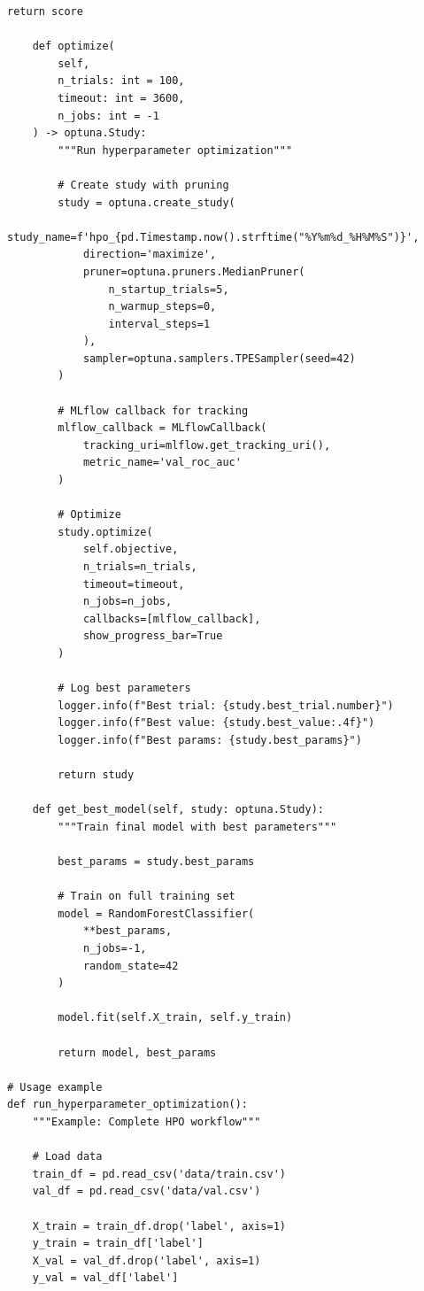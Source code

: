\begin{lstlisting}[style=python, caption=Hyperparameter Optimization with Optuna]
        return score

    def optimize(
        self,
        n_trials: int = 100,
        timeout: int = 3600,
        n_jobs: int = -1
    ) -> optuna.Study:
        """Run hyperparameter optimization"""

        # Create study with pruning
        study = optuna.create_study(
            study_name=f'hpo_{pd.Timestamp.now().strftime("%Y%m%d_%H%M%S")}',
            direction='maximize',
            pruner=optuna.pruners.MedianPruner(
                n_startup_trials=5,
                n_warmup_steps=0,
                interval_steps=1
            ),
            sampler=optuna.samplers.TPESampler(seed=42)
        )

        # MLflow callback for tracking
        mlflow_callback = MLflowCallback(
            tracking_uri=mlflow.get_tracking_uri(),
            metric_name='val_roc_auc'
        )

        # Optimize
        study.optimize(
            self.objective,
            n_trials=n_trials,
            timeout=timeout,
            n_jobs=n_jobs,
            callbacks=[mlflow_callback],
            show_progress_bar=True
        )

        # Log best parameters
        logger.info(f"Best trial: {study.best_trial.number}")
        logger.info(f"Best value: {study.best_value:.4f}")
        logger.info(f"Best params: {study.best_params}")

        return study

    def get_best_model(self, study: optuna.Study):
        """Train final model with best parameters"""

        best_params = study.best_params

        # Train on full training set
        model = RandomForestClassifier(
            **best_params,
            n_jobs=-1,
            random_state=42
        )

        model.fit(self.X_train, self.y_train)

        return model, best_params

# Usage example
def run_hyperparameter_optimization():
    """Example: Complete HPO workflow"""

    # Load data
    train_df = pd.read_csv('data/train.csv')
    val_df = pd.read_csv('data/val.csv')

    X_train = train_df.drop('label', axis=1)
    y_train = train_df['label']
    X_val = val_df.drop('label', axis=1)
    y_val = val_df['label']


\end{lstlisting}
